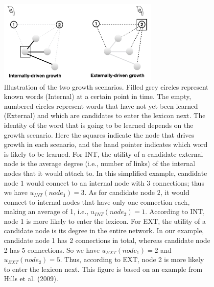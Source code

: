 \documentclass[english,floatsintext,man]{apa6}
\theoremstyle{definition}
\theoremstyle{definition}
\theoremstyle{definition}
\theoremstyle{remark}
\begin{document}
\begin{figure}

{\centering \includegraphics[width=300px]{figs/growth3} 

}

\caption{Illustration of the two growth scenarios. Filled grey circles represent known words (Internal) at a certain point in time. The empty, numbered circles represent words that have not yet been learned (External) and which are candidates to enter the lexicon next. The identity of the word that is going to be learned depends on the growth scenario.  Here the squares indicate the node that drives growth in each scenario, and the hand pointer indicates which word is likely to be learned. For INT, the utility of a candidate external node is the average degree (i.e., number of links) of the internal nodes that it would attach to. In this simplified example, candidate node 1 would connect to an internal node with 3 connections; thus we have $u_{INT}(node_1)= 3$. As for candidate node 2, it would connect to internal nodes that have only one connection each, making an average of 1, i.e., $u_{INT}(node_2)= 1$. According to INT, node 1 is more likely to enter the lexicon. For EXT, the utility of a candidate node is its degree in the entire network. In our example, candidate node 1 has 2 connections in total, whereas candidate node 2 has 5 connections. So we have $u_{EXT}(node_1)= 2$ and $u_{EXT}(node_2)= 5$. Thus, according to EXT, node 2 is more likely to enter the lexicon next. This figure is based on an example from Hills et al. (2009).}\label{fig:growth}
\end{figure}
\end{document}
